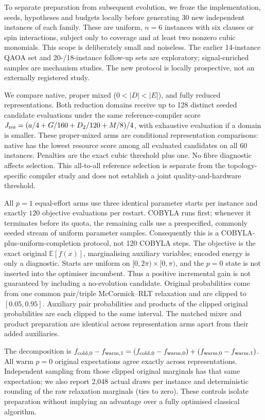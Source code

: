 \documentclass[a4paper,onecolumn,11pt,unpublished]{quantumarticle}
\theoremstyle{remark}
\begin{document}
\label{sec:fresh-qaoa}

To separate preparation from subsequent evolution, we froze the implementation, seeds, hypotheses and budgets locally before generating 30 new independent instances of each family. These are uniform, $n=6$ instances with six clauses or spin interactions, subject only to coverage and at least two nonzero cubic monomials. This scope is deliberately small and noiseless. The earlier 14-instance QAOA set and 20-/18-instance follow-up sets are exploratory; signal-enriched samples are mechanism studies. The new protocol is locally prospective, not an externally registered study.

We compare native, proper mixed ($0<|D|<|E|$), and fully reduced representations. Both reduction domains receive up to 128 distinct seeded candidate evaluations under the same reference-compiler score $J_{\rm res}=(a/4+G/160+D_2/120+M/8)/4$, with exhaustive evaluation if a domain is smaller. These proper-mixed arms are conditional representation comparisons: native has the lowest resource score among all evaluated candidates on all 60 instances. Penalties are the exact cubic threshold plus one. No fibre diagnostic affects selection. This all-to-all reference selection is separate from the topology-specific compiler study and does not establish a joint quality-and-hardware threshold.

All $p=1$ equal-effort arms use three identical parameter starts per instance and exactly $120$ objective evaluations per restart. COBYLA runs first; whenever it terminates before its quota, the remaining calls use a prespecified, commonly seeded stream of uniform parameter samples. Consequently this is a COBYLA-plus-uniform-completion protocol, not 120 COBYLA steps. The objective is the exact original $\mathbb E[f(x)]$, marginalising auxiliary variables; encoded energy is only a diagnostic. Starts are uniform on $[0,2\pi)\times[0,\pi)$, and the $p=0$ state is not inserted into the optimiser incumbent. Thus a positive incremental gain is not guaranteed by including a no-evolution candidate. Original probabilities come from one common pair/triple McCormick--RLT relaxation and are clipped to $[0.05,0.95]$. Auxiliary pair probabilities and products of the clipped original probabilities are each clipped to the same interval. The matched mixer and product preparation are identical across representation arms apart from their added auxiliaries.

The decomposition is $f_{\rm cold,0}-f_{\rm warm,1}=(f_{\rm cold,0}-f_{\rm warm,0})+(f_{\rm warm,0}-f_{\rm warm,1})$. All warm $p=0$ original expectations agree exactly across representations. Independent sampling from those clipped original marginals has that same expectation; we also report 2,048 actual draws per instance and deterministic rounding of the raw relaxation marginals (ties to zero). These controls isolate preparation without implying an advantage over a fully optimised classical algorithm.
\end{document}
